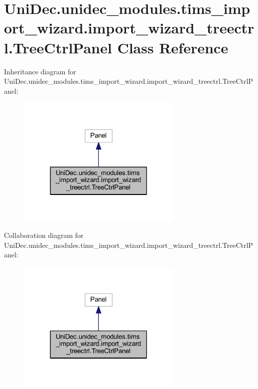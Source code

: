 \hypertarget{class_uni_dec_1_1unidec__modules_1_1tims__import__wizard_1_1import__wizard__treectrl_1_1_tree_ctrl_panel}{}\section{Uni\+Dec.\+unidec\+\_\+modules.\+tims\+\_\+import\+\_\+wizard.\+import\+\_\+wizard\+\_\+treectrl.\+Tree\+Ctrl\+Panel Class Reference}
\label{class_uni_dec_1_1unidec__modules_1_1tims__import__wizard_1_1import__wizard__treectrl_1_1_tree_ctrl_panel}


Inheritance diagram for Uni\+Dec.\+unidec\+\_\+modules.\+tims\+\_\+import\+\_\+wizard.\+import\+\_\+wizard\+\_\+treectrl.\+Tree\+Ctrl\+Panel\+:\nopagebreak
\begin{figure}[H]
\begin{center}
\leavevmode
\includegraphics[width=225pt]{class_uni_dec_1_1unidec__modules_1_1tims__import__wizard_1_1import__wizard__treectrl_1_1_tree_ctrl_panel__inherit__graph}
\end{center}
\end{figure}


Collaboration diagram for Uni\+Dec.\+unidec\+\_\+modules.\+tims\+\_\+import\+\_\+wizard.\+import\+\_\+wizard\+\_\+treectrl.\+Tree\+Ctrl\+Panel\+:\nopagebreak
\begin{figure}[H]
\begin{center}
\leavevmode
\includegraphics[width=225pt]{class_uni_dec_1_1unidec__modules_1_1tims__import__wizard_1_1import__wizard__treectrl_1_1_tree_ctrl_panel__coll__graph}
\end{center}
\end{figure}
